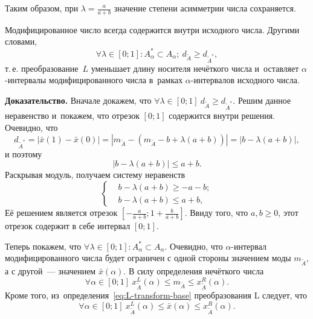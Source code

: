 Таким образом, при $\displaystyle \lambda =\frac{a}{a+b}$ значение степени асимметрии числа сохраняется.

\begin{prop}
\label{prop:L-prop3}
Модифицированное число всегда содержится внутри исходного числа. Другими словами, 
\begin{equation*}
  \forall \lambda \in \left[ 0;1 \right]: A_{\alpha}^{*}\subset A_\alpha;\ d_{\tilde A} \geqslant d_{\tilde A^{*}},
\end{equation*}
т.\,е. преобразование~$L$ уменьшает длину носителя нечёткого числа и~оставляет $\alpha$-интервалы модифицированного числа в~рамках $\alpha$-интервалов исходного числа.
\end{prop}
\textbf{Доказательство.} Вначале докажем, что $\forall \lambda \in \left[ 0;1 \right]\ d_{\tilde A}\geqslant d_{\tilde A^{*}}$. Решим данное неравенство и~покажем, что отрезок $\left[ 0;1 \right]$ содержится внутри решения. Очевидно, что
\begin{equation*}
  d_{\tilde A^{*}}=\left| \bar{x}\left( 1 \right)-\bar{x}\left( 0 \right) \right|=\left| m_{\tilde A}-\left( m_{\tilde A}-b+\lambda \left( a+b \right) \right) \right|=\left| b-\lambda \left( a+b \right) \right|,
\end{equation*}
и поэтому
\begin{equation*}
  \left| b-\lambda (a+b) \right|\leqslant a+b.
\end{equation*}
Раскрывая модуль, получаем систему неравенств
\begin{equation*}
  \left\{ \begin{aligned}
    & b-\lambda \left( a+b \right)\geqslant -a-b; \\ 
    & b-\lambda \left( a+b \right)\leqslant a+b,
  \end{aligned} \right.
\end{equation*}
Её решением является отрезок $\displaystyle \left[ -\frac{a}{a+b};1+\frac{b}{a+b} \right]$. Ввиду того, что $a,b\geqslant 0$, этот отрезок содержит в себе интервал $\left[ 0;1 \right]$.

Теперь покажем, что $\forall \lambda \in \left[ 0;1 \right]:A_{\alpha}^{*}\subset A_\alpha$. Очевидно, что $\alpha$-интервал модифицированного числа будет ограничен с одной стороны значением моды $m_{\tilde A}$, а с другой~--- значением $\bar{x}\left( \alpha  \right)$. В силу определения нечёткого числа
\begin{equation}
\label{eq:L-prop2-bordercase1}
  \forall \alpha \in \left[ 0;1 \right]\ x_{\tilde A}^{L}(\alpha )\leqslant m_{\tilde A}\le x_{\tilde A}^{R}(\alpha).
\end{equation}
Кроме того, из~определения~\eqref{eq:L-transform-base} преобразования L следует, что
\begin{equation}
\label{eq:L-prop2-bordercase2}
  \forall \alpha \in \left[ 0;1 \right]\ x_{\tilde A}^{L}(\alpha )\leqslant \bar{x}(\alpha )\leqslant x_{\tilde A}^{R}(\alpha).
\end{equation}

